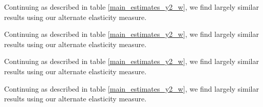 \documentclass[12pt,a4paper]{article}
\begin{document}
\begin{table}[H]
	\begin{center}
		
		\label{environmental_estimates_y2_w}
		\caption[Alternate Environmental Predictor Estimates, Weighted]{Continuing as described in table \ref{main_estimates_y2_w}, we find largely similar results using our alternate elasticity measure.}
	\end{center}
\end{table}

\begin{table}[H]
	\begin{center}
		
		\label{transportation_estimates_y2_w}
		\caption[Alternate Transportation Infrastructure Predictor Estimates, Weighted]{Continuing as described in table \ref{main_estimates_y2_w}, we find largely similar results using our alternate elasticity measure.}
	\end{center}
\end{table}

\begin{table}[H]
	\begin{center}
		
		\label{demographic_estimates_y2_w}
		\caption[Alternate Demographic Predictor Estimates, Weighted]{Continuing as described in table \ref{main_estimates_y2_w}, we find largely similar results using our alternate elasticity measure.}
	\end{center}
\end{table}

\begin{table}[H]
	\begin{center}
		
		\label{pop_share_estimates_y2_w}
		\caption[Alternate Cheaper Gas Border Predictor Estimates, Weighted]{Continuing as described in table \ref{main_estimates_y2_w}, we find largely similar results using our alternate elasticity measure.}
	\end{center}
\end{table}

\end{document}

